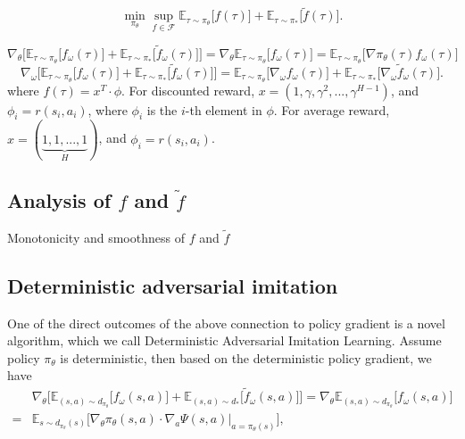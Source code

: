 \begin{equation*}
\min_{\pi_{\theta}} \sup_{f\in\mathcal{F}} \mathbb{E}_{\tau\sim \pi_{\theta}} \big[ f(\tau) \big] + \mathbb{E}_{\tau\sim \pi_*} \big[\tilde{f}(\tau) \big].
\end{equation*}

\begin{equation*}
\nabla_{\theta} \Big[ \mathbb{E}_{\tau\sim \pi_{\theta}} \big[ f_{\omega}(\tau) \big] + \mathbb{E}_{\tau\sim \pi_*} \big[ \tilde{f}_{\omega}(\tau) \big] \Big]
= \nabla_{\theta} \mathbb{E}_{\tau\sim \pi_{\theta}} \big[ f_{\omega}(\tau) \big]
= \mathbb{E}_{\tau\sim \pi_{\theta}}\big[ \nabla \pi_{\theta}(\tau) f_{\omega}(\tau) \big]
\end{equation*}
\begin{equation*}
\nabla_{\omega} \Big[ \mathbb{E}_{\tau\sim \pi_{\theta}} \big[ f_{\omega}(\tau) \big] + \mathbb{E}_{\tau\sim \pi_*} \big[ \tilde{f}_{\omega}(\tau) \big] \Big]
= \mathbb{E}_{\tau\sim \pi_{\theta}} \big[ \nabla_{\omega} f_{\omega}(\tau) \big] + \mathbb{E}_{\tau\sim \pi_*} \big[ \nabla_{\omega} \tilde{f}_{\omega}(\tau) \big].
\end{equation*}
where $f(\tau)= x^{T} \cdot \phi$. For discounted reward, $x= (1, \gamma, \gamma^{2},..., \gamma^{H-1})$, and $\phi_i=r(s_i, a_i)$, where $\phi_i$ is the $i$-th element in $\phi$. 
For average reward, $x= (\underbrace{1, 1,..., 1}_{H})$, and $\phi_i=r(s_i, a_i)$. 

\subsection{Analysis of $f$ and $\tilde{f}$}
Monotonicity and smoothness of $f$ and $\tilde{f}$


\subsection{Deterministic adversarial imitation}
One of the direct outcomes of the above connection to policy gradient is a novel algorithm, which we call Deterministic Adversarial Imitation Learning. 
Assume policy $\pi_{\theta}$ is deterministic, then based on the deterministic policy gradient, we have
\begin{align*}
& \nabla_{\theta} \Big[ \mathbb{E}_{(s, a)\sim d_{\pi_{\theta}}} \big[ f_{\omega}(s, a) \big] + \mathbb{E}_{(s, a)\sim d_*} \big[ \tilde{f}_{\omega}(s, a) \big] \Big] 
= \nabla_{\theta} \mathbb{E}_{(s, a)\sim d_{\pi_{\theta}}} \big[ f_{\omega}(s, a) \big] \\ 
= & \mathbb{E}_{s\sim d_{\pi_{\theta}}(s)} \big[  \nabla_\theta \pi_{\theta}(s, a) \cdot \nabla_a \Psi(s, a)\big|_{a=\pi_{\theta}(s)}\big], 
\end{align*}

